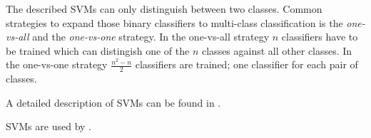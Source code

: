 The described \glspl{SVM} can only distinguish between two classes. Common
strategies to expand those binary classifiers to multi-class classification is
the \textit{one-vs-all} and the \textit{one-vs-one} strategy. In the one-vs-all
strategy $n$ classifiers have to be trained which can distingish one of the $n$
classes against all other classes. In the one-vs-one strategy $\frac{n^2 - n}{2}$
classifiers are trained; one classifier for each pair of classes.

A detailed description of \glspl{SVM} can be found in \cite{burges1998tutorial}.

\Glspl{SVM} are used by \cite{yang2012layered}.
